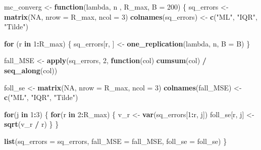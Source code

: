 \documentclass[
]{article}
\newenvironment{Shaded}{\begin{snugshade}}{\end{snugshade}}
\newcommand{\AttributeTok}[1]{\textcolor[rgb]{0.13,0.29,0.53}{#1}}
\newcommand{\ConstantTok}[1]{\textcolor[rgb]{0.56,0.35,0.01}{#1}}
\newcommand{\ControlFlowTok}[1]{\textcolor[rgb]{0.13,0.29,0.53}{\textbf{#1}}}
\newcommand{\DecValTok}[1]{\textcolor[rgb]{0.00,0.00,0.81}{#1}}
\newcommand{\FunctionTok}[1]{\textcolor[rgb]{0.13,0.29,0.53}{\textbf{#1}}}
\newcommand{\NormalTok}[1]{#1}
\newcommand{\OtherTok}[1]{\textcolor[rgb]{0.56,0.35,0.01}{#1}}
\newcommand{\SpecialCharTok}[1]{\textcolor[rgb]{0.81,0.36,0.00}{\textbf{#1}}}
\newcommand{\StringTok}[1]{\textcolor[rgb]{0.31,0.60,0.02}{#1}}
\begin{document}
\begin{Shaded}
\begin{Highlighting}[]
\NormalTok{mc\_converg }\OtherTok{\textless{}{-}} \ControlFlowTok{function}\NormalTok{(lambda, n , R\_max, }\AttributeTok{B =} \DecValTok{200}\NormalTok{) \{}
\NormalTok{  sq\_errors }\OtherTok{\textless{}{-}} \FunctionTok{matrix}\NormalTok{(}\ConstantTok{NA}\NormalTok{, }\AttributeTok{nrow =}\NormalTok{ R\_max, }\AttributeTok{ncol =} \DecValTok{3}\NormalTok{)}
  \FunctionTok{colnames}\NormalTok{(sq\_errors) }\OtherTok{\textless{}{-}} \FunctionTok{c}\NormalTok{(}\StringTok{"ML"}\NormalTok{, }\StringTok{"IQR"}\NormalTok{, }\StringTok{"Tilde"}\NormalTok{)}
  
  \ControlFlowTok{for}\NormalTok{ (r }\ControlFlowTok{in} \DecValTok{1}\SpecialCharTok{:}\NormalTok{R\_max) \{}
\NormalTok{    sq\_errors[r, ] }\OtherTok{\textless{}{-}} \FunctionTok{one\_replication}\NormalTok{(lambda, n, }\AttributeTok{B =}\NormalTok{ B)}
\NormalTok{  \}}

\NormalTok{fall\_MSE }\OtherTok{\textless{}{-}} \FunctionTok{apply}\NormalTok{(sq\_errors, }\DecValTok{2}\NormalTok{, }\ControlFlowTok{function}\NormalTok{(col) }\FunctionTok{cumsum}\NormalTok{(col) }\SpecialCharTok{/} \FunctionTok{seq\_along}\NormalTok{(col))}

\NormalTok{foll\_se }\OtherTok{\textless{}{-}} \FunctionTok{matrix}\NormalTok{(}\ConstantTok{NA}\NormalTok{, }\AttributeTok{nrow =}\NormalTok{ R\_max, }\AttributeTok{ncol =} \DecValTok{3}\NormalTok{)}
\FunctionTok{colnames}\NormalTok{(fall\_MSE) }\OtherTok{\textless{}{-}} \FunctionTok{c}\NormalTok{(}\StringTok{"ML"}\NormalTok{, }\StringTok{"IQR"}\NormalTok{, }\StringTok{"Tilde"}\NormalTok{)}

\ControlFlowTok{for}\NormalTok{(j }\ControlFlowTok{in} \DecValTok{1}\SpecialCharTok{:}\DecValTok{3}\NormalTok{) \{}
  \ControlFlowTok{for}\NormalTok{(r }\ControlFlowTok{in} \DecValTok{2}\SpecialCharTok{:}\NormalTok{R\_max) \{}
\NormalTok{    v\_r }\OtherTok{\textless{}{-}} \FunctionTok{var}\NormalTok{(sq\_errors[}\DecValTok{1}\SpecialCharTok{:}\NormalTok{r, j])}
\NormalTok{    foll\_se[r, j] }\OtherTok{\textless{}{-}} \FunctionTok{sqrt}\NormalTok{(v\_r }\SpecialCharTok{/}\NormalTok{ r)}
\NormalTok{  \}}
\NormalTok{\} }

\FunctionTok{list}\NormalTok{(}\AttributeTok{sq\_errors =}\NormalTok{ sq\_errors, }\AttributeTok{fall\_MSE =}\NormalTok{ fall\_MSE, }\AttributeTok{foll\_se =}\NormalTok{ foll\_se)}
\NormalTok{\}}
\end{Highlighting}
\end{Shaded}
\end{document}
